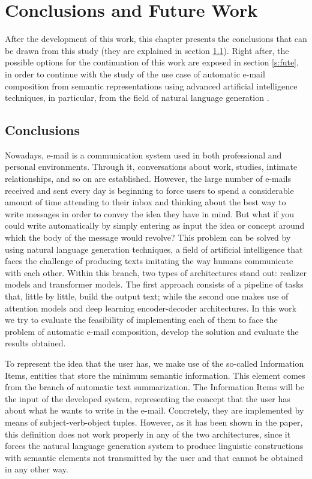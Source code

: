 \chapter{Conclusions and Future Work}
\label{cap:conclusions}


After the development of this work, this chapter presents the conclusions that can be drawn from this study (they are explained in section \ref{s:concle}). Right after, the possible options for the continuation of this work are exposed in section \ref{s:fute}, in order to continue with the study of the use case of automatic e-mail composition from semantic representations using advanced artificial intelligence techniques, in particular, from the field of natural language generation .

\section{Conclusions}\label{s:concle}

Nowadays, e-mail is a communication system used in both professional and personal environments. Through it, conversations about work, studies, intimate relationships, and so on are established. However, the large number of e-mails received and sent every day is beginning to force users to spend a considerable amount of time attending to their inbox and thinking about the best way to write messages in order to convey the idea they have in mind. But what if you could write automatically by simply entering as input the idea or concept around which the body of the message would revolve? This problem can be solved by using natural language generation techniques, a field of artificial intelligence that faces the challenge of producing texts imitating the way humans communicate with each other. Within this branch, two types of architectures stand out: realizer models and transformer models. The first approach consists of a pipeline of tasks that, little by little, build the output text; while the second one makes use of attention models and deep learning encoder-decoder architectures. In this work we try to evaluate the feasibility of implementing each of them to face the problem of automatic e-mail composition, develop the solution and evaluate the results obtained.

To represent the idea that the user has, we make use of the so-called Information Items, entities that store the minimum semantic information. This element comes from the branch of automatic text summarization. The Information Items will be the input of the developed system, representing the concept that the user has about what he wants to write in the e-mail. Concretely, they are implemented by means of subject-verb-object tuples. However, as it has been shown in the paper, this definition does not work properly in any of the two architectures, since it forces the natural language generation system to produce linguistic constructions with semantic elements not transmitted by the user and that cannot be obtained in any other way.

